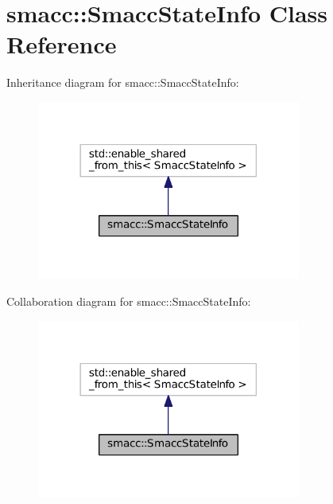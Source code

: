 \hypertarget{classsmacc_1_1SmaccStateInfo}{}\section{smacc\+:\+:Smacc\+State\+Info Class Reference}
\label{classsmacc_1_1SmaccStateInfo}


Inheritance diagram for smacc\+:\+:Smacc\+State\+Info\+:
\nopagebreak
\begin{figure}[H]
\begin{center}
\leavevmode
\includegraphics[width=246pt]{classsmacc_1_1SmaccStateInfo__inherit__graph}
\end{center}
\end{figure}


Collaboration diagram for smacc\+:\+:Smacc\+State\+Info\+:
\nopagebreak
\begin{figure}[H]
\begin{center}
\leavevmode
\includegraphics[width=246pt]{classsmacc_1_1SmaccStateInfo__coll__graph}
\end{center}
\end{figure}
